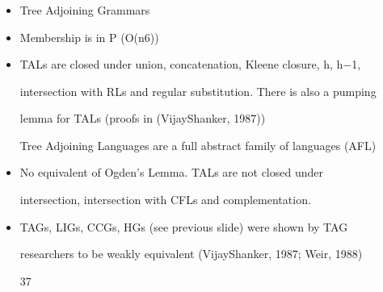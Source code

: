 \documentclass[compress,color=usenames]{beamer}
\begin{document}
\begin{frame}
\frametitle{}

\begin{itemize}
\item

Tree Adjoining Grammars





\item Membership is in P (O(n6))


\item TALs are closed under union, concatenation, Kleene closure, h, h$-$1,


intersection with RLs and regular substitution. There is also a pumping


lemma for TALs (proofs in (VijayShanker, 1987))


Tree Adjoining Languages are a full abstract family of languages (AFL)





\item No equivalent of Ogden's Lemma. TALs are not closed under


intersection, intersection with CFLs and complementation.





\item TAGs, LIGs, CCGs, HGs (see previous slide) were shown by TAG


researchers to be weakly equivalent (VijayShanker, 1987; Weir, 1988)


37




\end{itemize}

\end{frame}
\end{document}
